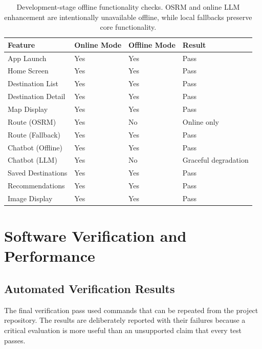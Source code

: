 \documentclass[12pt,a4paper,oneside]{report}
\begin{document}
\begin{table}[h]
\centering
\small
\begin{tabular}{llll}
\toprule
\textbf{Feature} & \textbf{Online Mode} & \textbf{Offline Mode} & \textbf{Result} \\
\midrule
App Launch & Yes & Yes & Pass \\
Home Screen & Yes & Yes & Pass \\
Destination List & Yes & Yes & Pass \\
Destination Detail & Yes & Yes & Pass \\
Map Display & Yes & Yes & Pass \\
Route (OSRM) & Yes & No & Online only \\
Route (Fallback) & Yes & Yes & Pass \\
Chatbot (Offline) & Yes & Yes & Pass \\
Chatbot (LLM) & Yes & No & Graceful degradation \\
Saved Destinations & Yes & Yes & Pass \\
Recommendations & Yes & Yes & Pass \\
Image Display & Yes & Yes & Pass \\
\bottomrule
\end{tabular}
\caption{Development-stage offline functionality checks. OSRM and online LLM enhancement are intentionally unavailable offline, while local fallbacks preserve core functionality.}
\label{tbl:offline_tests}
\end{table}

\section{Software Verification and Performance}
\label{sec:performance}

\subsection{Automated Verification Results}

The final verification pass used commands that can be repeated from the project repository. The results are deliberately reported with their failures because a critical evaluation is more useful than an unsupported claim that every test passes.
\end{document}
